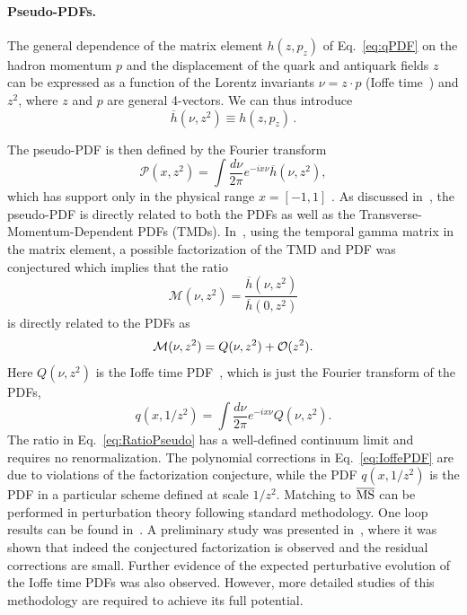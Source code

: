 \paragraph*{Pseudo-PDFs.} 
The general dependence of the  matrix element $h(z,p_z)$ of Eq.~\eqref{eq:qPDF} 
on the hadron momentum $p$ and the displacement of the quark and antiquark 
fields $z$ can be expressed as a function of the Lorentz invariants 
$\nu=z\cdot p$ (Ioffe time~\cite{Ioffe:1969kf,Braun:1994jq}) 
and $z^2$, where $z$ and $p$ are general 4-vectors.  
%
We can thus introduce
\begin{equation}
\overline{h}(\nu,z^2) \equiv h(z,p_z)\,.
\end{equation}

The pseudo-PDF is then defined by the Fourier transform
%
\begin{equation}
{\mathcal P}(x,z^2)=\int \frac{d\nu}{2\pi} e^{-ix\nu} \overline{h}(\nu,z^2),
\end{equation}
which has support only in the physical range 
$x=[-1,1]$ \cite{Radyushkin:2016hsy,Radyushkin:2017cyf}. 
%
As discussed in~\cite{Radyushkin:2016hsy,Radyushkin:2017cyf}, the pseudo-PDF 
is directly related to both the PDFs as well as the 
Transverse-Momentum-Dependent PDFs (TMDs).
%
In~\cite{Radyushkin:2017cyf}, using the temporal gamma matrix in the matrix 
element, a possible factorization of the TMD and PDF was conjectured which 
implies that the ratio
%
\begin{equation}
{\mathcal M}(\nu,z^2) =\frac{\overline h(\nu,z^2)}{\overline h(0,z^2)}
\label{eq:RatioPseudo}
\end{equation}
is directly related to the PDFs as 
\begin{equation}
{\mathcal M}(\nu,z^2) =Q(\nu,z^2) + {\cal O}(z^2).
\label{eq:IoffePDF}
\end{equation}
%
Here $Q(\nu,z^2)$ is the Ioffe time PDF~\cite{Ioffe:1969kf,Braun:1994jq}, 
which is just the Fourier transform of the PDFs,
\begin{equation}
{q}(x,1/z^2)=\int \frac{d\nu}{2\pi} e^{-ix\nu} Q(\nu,z^2).
\end{equation}
%
The ratio in Eq.~\eqref{eq:RatioPseudo} has a well-defined continuum 
limit and requires no renormalization. 
%
The polynomial corrections in Eq.~\eqref{eq:IoffePDF} are due to violations of 
the factorization conjecture, while the PDF ${q}(x,1/z^2)$ is the PDF in a 
particular scheme defined at scale $1/z^2$. Matching to $\overline{\rm MS}$ 
can be performed in perturbation theory following standard methodology. 
%
One loop results can be found in~\cite{Ji:2017rah,Radyushkin:2017lvu}.
%
A preliminary study was presented in~\cite{Orginos:2017kos,Karpie:2017bzm}, 
where it was shown that indeed the conjectured factorization is observed and 
the residual corrections are small. 
%
Further  evidence of the expected 
perturbative evolution of the Ioffe time PDFs was also observed. 
%
However, more detailed studies of this methodology are required to achieve 
its full potential.  
